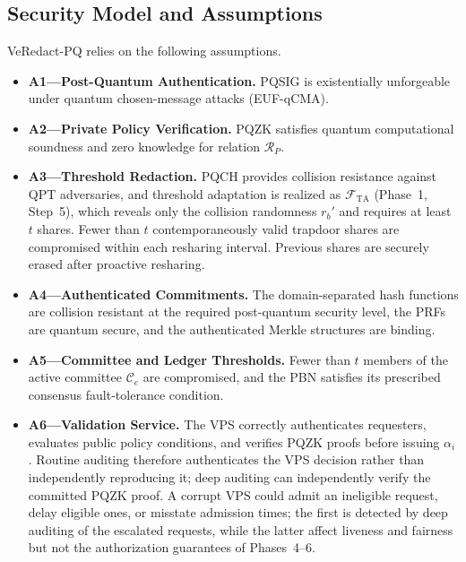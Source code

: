 \documentclass[lettersize,journal]{IEEEtran}
\begin{document}
\subsection{Security Model and Assumptions}

VeRedact-PQ relies on the following assumptions.

\begin{itemize}

\item \textbf{A1---Post-Quantum Authentication.}
PQSIG is existentially unforgeable under quantum chosen-message
attacks (EUF-qCMA).

\item \textbf{A2---Private Policy Verification.}
PQZK satisfies quantum computational soundness and zero knowledge for
relation $\mathcal{R}_P$.

\item \textbf{A3---Threshold Redaction.}
PQCH provides collision resistance against QPT adversaries, and
threshold adaptation is realized as $\mathcal{F}_{\mathrm{TA}}$
(Phase~1, Step~5), which reveals only the collision randomness
$r_b'$ and requires at least $t$ shares. Fewer than $t$ contemporaneously valid
trapdoor shares are compromised within each resharing interval.
Previous shares are securely erased after proactive resharing.

\item \textbf{A4---Authenticated Commitments.}
The domain-separated hash functions are collision resistant at the
required post-quantum security level, the PRFs are quantum secure, and
the authenticated Merkle structures are binding.

\item \textbf{A5---Committee and Ledger Thresholds.}
Fewer than $t$ members of the active committee $\mathcal{C}_e$ are
compromised, and the PBN satisfies its prescribed consensus
fault-tolerance condition.

\item \textbf{A6---Validation Service.}
The VPS correctly authenticates requesters, evaluates public policy
conditions, and verifies PQZK proofs before issuing $\alpha_i$.
Routine auditing therefore authenticates the VPS decision rather than
independently reproducing it; deep auditing can independently verify
the committed PQZK proof. A corrupt VPS could admit an ineligible
request, delay eligible ones, or misstate admission times; the first is
detected by deep auditing of the escalated requests, while the latter
affect liveness and fairness but not the authorization guarantees of
Phases~4--6.

\end{itemize}
\end{document}
